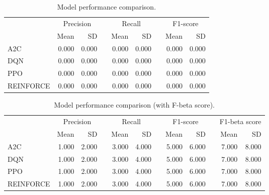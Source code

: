 \documentclass[]{article}
\newcommand{\rowspace}[1]{\renewcommand{\arraystretch}{#1}}
\begin{document}
\begin{table*}[hbt!]\centering
	\rowspace{1.3}
	\begin{tabular}{@{}l rr c rr c rr@{}}
		\arrayrulecolor{black!40}\toprule
		 & \multicolumn{2}{c}{Precision} & \phantom{i} & \multicolumn{2}{c}{Recall} & \phantom{i} & \multicolumn{2}{c}{F1-score} \\
		\cmidrule{2-3} \cmidrule{5-6} \cmidrule{8-9} 
		
		&Mean &SD & &Mean &SD & &Mean &SD \\ \midrule
		A2C &0.000 &0.000 & &0.000 &0.000 & &0.000 &0.000 \\
		DQN &0.000 &0.000 & &0.000 &0.000 & &0.000 &0.000 \\
		PPO &0.000 &0.000 & &0.000 &0.000 & &0.000 &0.000 \\
		REINFORCE &0.000 &0.000 & &0.000 &0.000 & &0.000 &0.000 \\
		
		\bottomrule
\end{tabular}
\caption{Model performance comparison.}
\end{table*}

\begin{table*}[hbt!]\centering
	\rowspace{1.3}
	\begin{tabular}{@{}l rr c rr c rr c rr@{}}
		\arrayrulecolor{black!40}\toprule
		& \multicolumn{2}{c}{Precision} & \phantom{i} & \multicolumn{2}{c}{Recall} & \phantom{i} & \multicolumn{2}{c}{F1-score} & \phantom{i} & \multicolumn{2}{c}{F1-beta score} \\
		\cmidrule{2-3} \cmidrule{5-6} \cmidrule{8-9} \cmidrule{11-12} 
		
		&Mean &SD & &Mean &SD & &Mean &SD& &Mean & SD\\ \midrule
		A2C &1.000 &2.000 &  &3.000 &4.000 & & 5.000 &6.000 & &7.000 &8.000 \\
		DQN &1.000 &2.000 &  &3.000 &4.000 & & 5.000 &6.000 & &7.000 &8.000 \\
		PPO &1.000 &2.000 &  &3.000 &4.000 & & 5.000 &6.000 & &7.000 &8.000 \\
		REINFORCE &1.000 &2.000 &  &3.000 &4.000 & & 5.000 &6.000 & &7.000 &8.000 \\
		
		\bottomrule
	\end{tabular}
	\caption{Model performance comparison (with F-beta score). }
\end{table*}
\end{document}
